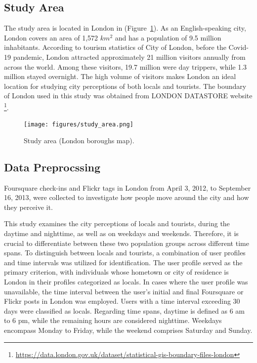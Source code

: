 \documentclass{article}
\theoremstyle{remark}
\begin{document}
\subsection{Study Area}
The study area is located in London in (Figure~\ref{fig:study_area}). As an English-speaking
city, London covers an area of 1,572 \(km^2\) and has a population of 9.5 million inhabitants. According to tourism statistics of City of London, before the Covid-19 pandemic, London attracted approximately 21 million visitors annually from across the world. Among these visitors, 19.7 million were day trippers, while 1.3 million stayed overnight. The high volume of visitors makes London an ideal location for studying city perceptions of both locals and tourists. The boundary of London used in this study was obtained from LONDON DATASTORE website \footnote{\url{https://data.london.gov.uk/dataset/statistical-gis-boundary-files-london}}.

\begin{figure}[h!]
\centering
\texttt{[image: figures/study\_area.png]}
\caption{\label{fig:study_area}Study area (London boroughs map).}
\end{figure}

\subsection{Data Preprocssing} \label{data_preprocessing}
Foursquare check-ins and Flickr tags in London from April 3, 2012, to September 16, 2013, were collected to investigate how people move around the city and how they perceive it.

This study examines the city perceptions of locals and tourists, during the daytime and nighttime, as well as on weekdays and weekends. Therefore, it is crucial to differentiate between these two population groups across different time spans. To distinguish between locals and tourists, a combination of user profiles and time intervals was utilized for identification. The user profile served as the primary criterion, with individuals whose hometown or city of residence is London in their profiles categorized as locals. In cases where the user profile was unavailable, the time interval between the user's initial and final Foursquare or Flickr posts in London was employed. Users with a time interval exceeding 30 days were classified as locals. Regarding time spans, daytime is defined as 6 am to 6 pm, while the remaining hours are considered nighttime. Weekdays encompass Monday to Friday, while the weekend comprises Saturday and Sunday.
\end{document}
